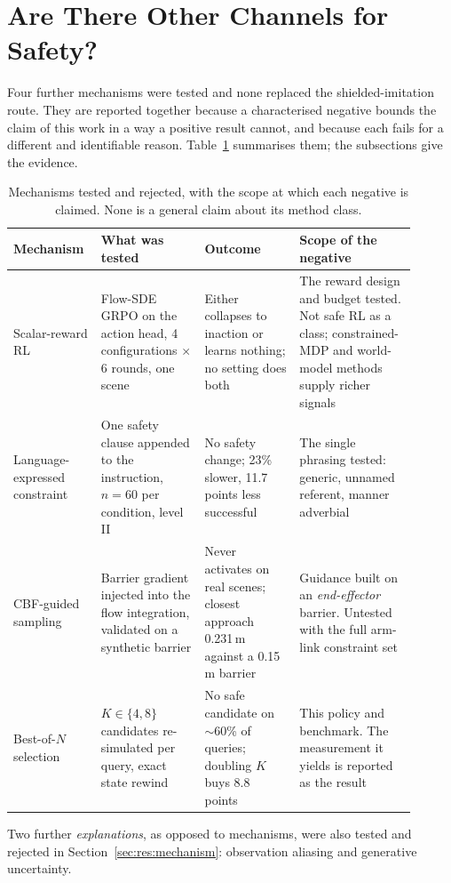 \documentclass[a4paper,11pt]{report}
\begin{document}
\section{Are There Other Channels for Safety?}\label{sec:res:channels}

Four further mechanisms were tested and none replaced the shielded-imitation route. They are
reported together because a characterised negative bounds the claim of this work in a way a
positive result cannot, and because each fails for a different and identifiable reason.
Table~\ref{tab:negatives} summarises them; the subsections give the evidence.

\begin{table}[htbp]
\centering
\begin{threeparttable}
\caption[Mechanisms tested and rejected]{%
  Mechanisms tested and rejected, with the scope at which each negative is claimed. None is a
  general claim about its method class.}
\label{tab:negatives}
\footnotesize
\begin{tabular}{p{0.17\linewidth}p{0.24\linewidth}p{0.22\linewidth}p{0.27\linewidth}}
\toprule
\textbf{Mechanism} & \textbf{What was tested} & \textbf{Outcome} & \textbf{Scope of the negative} \\
\midrule
Scalar-reward RL
  & Flow-SDE GRPO on the action head, 4 configurations $\times$ 6 rounds, one scene
  & Either collapses to inaction or learns nothing; no setting does both
  & The reward design and budget tested. Not safe RL as a class; constrained-MDP and
    world-model methods supply richer signals \\
\addlinespace[3pt]
Language-expressed constraint
  & One safety clause appended to the instruction, $n=60$ per condition, level II
  & No safety change; 23\% slower, 11.7 points less successful
  & The single phrasing tested: generic, unnamed referent, manner adverbial \\
\addlinespace[3pt]
CBF-guided sampling
  & Barrier gradient injected into the flow integration, validated on a synthetic barrier
  & Never activates on real scenes; closest approach 0.231\,m against a 0.15\,m barrier
  & Guidance built on an \emph{end-effector} barrier. Untested with the full arm-link
    constraint set \\
\addlinespace[3pt]
Best-of-$N$ selection
  & $K \in \{4, 8\}$ candidates re-simulated per query, exact state rewind
  & No safe candidate on $\sim$60\% of queries; doubling $K$ buys 8.8 points
  & This policy and benchmark. The measurement it yields is reported as the result \\
\bottomrule
\end{tabular}
\begin{tablenotes}[flushleft]\footnotesize
\item Two further \emph{explanations}, as opposed to mechanisms, were also tested and rejected in
  Section~\ref{sec:res:mechanism}: observation aliasing and generative uncertainty.
\end{tablenotes}
\end{threeparttable}
\end{table}
\end{document}
